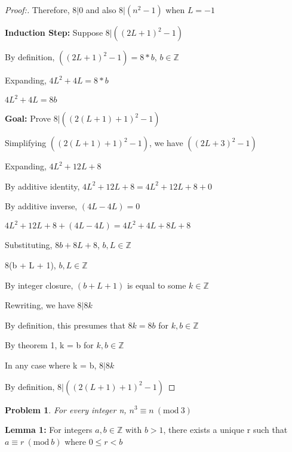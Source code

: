 \documentclass[12pt]{article}
\newtheorem{theorem}{Problem}[section]
\newcommand{\Mod}[1]{\ (\mathrm{mod}\ #1)}
\begin{document}
\begin{proof}[Proof:]
    Therefore, $8 | 0$ and also $8 | (n^2 - 1)$ when $L = -1$

    \medskip

    \textbf{Induction Step:} Suppose $8 | ((2L+1)^2 - 1)$

    By definition, $((2L + 1)^2 - 1) = 8 * b$, $b \in \mathbb{Z}$

    Expanding, $4L^2 + 4L = 8 * b$

    $4L^2 + 4L = 8b$

    \medskip

    \textbf{Goal:} Prove $8 | ((2(L + 1) + 1)^2 - 1)$

    Simplifying $((2(L + 1) + 1)^2 - 1)$, we have $((2L + 3)^2 - 1)$

    Expanding, $4L^2 + 12L + 8$

    By additive identity, $4L^2 + 12L + 8 = 4L^2 + 12L + 8 + 0$

    By additive inverse, $(4L - 4L) = 0$

    $4L^2 + 12L + 8 + (4L - 4L) = 4L^2 + 4L + 8L + 8$

    Substituting, $8b + 8L + 8$, $b, L \in \mathbb{Z}$

    8(b + L + 1), $b, L \in \mathbb{Z}$

    By integer closure, $(b + L + 1)$ is equal to some $ k \in \mathbb{Z}$

    Rewriting, we have $8 | 8k$

    By definition, this presumes that $8k = 8b$ for $k, b \in \mathbb{Z}$

    By theorem 1, k = b for $k, b \in \mathbb{Z}$

    In any case where k = b, $8 | 8k$

    By definition, $8 | ((2(L + 1) + 1)^2 - 1)$
    
\end{proof}

\newpage

\begin{theorem}
    For every integer n, $n^3 \equiv n \Mod{3}$
\end{theorem}

\textbf{Lemma 1:} For integers $a, b \in \mathbb{Z}$ with $b > 1$, there exists a unique r such that $a \equiv r \Mod{b}$ where $0 \le r < b$
\end{document}
